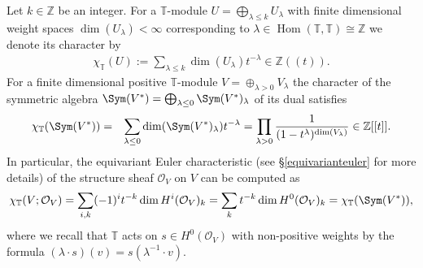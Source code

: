 \documentclass[12pt]{article}
\numberwithin{equation}{section}
\theoremstyle{remark}
\theoremstyle{definition}
\numberwithin{theorem}{section}
\def\beq{\begin{eqnarray}}
\def\eeq{\end{eqnarray}}
\DeclareMathOperator{\Hom}{Hom}
\newcommand{\T}{{\mathbb{T}}}
\def\calO{{\mathcal O}}
\def\Z{\mathbb{Z}}
\renewcommand{\1}{\mathbbm{1}}
\begin{document}
 Let $k\in \Z$ be an integer. For a $\T$-module $U=\bigoplus_{\lambda\leq k} U_\lambda$  with finite dimensional weight spaces $\dim(U_\lambda)<\infty$ corresponding to $\lambda\in \Hom(\T,\T)\cong \Z$   we denote its character by \beq\label{trunchar}\chi_\T(U):=\sum_{\lambda\leq k} \dim(U_\lambda)t^{-\lambda} \in \Z((t)).\eeq For a finite dimensional positive $\T$-module $V=\oplus_{\lambda>0} V_\lambda$  the  character of the  symmetric algebra $\Sym(V^*)=\bigoplus_{\lambda\leq 0} \Sym(V^*)_\lambda$ of its dual satisfies
\beq\label{sym} \chi_\T({\Sym(V^*)})&=& \sum_{\lambda\leq 0} \dim(\Sym(V^*)_\lambda)t^{-\lambda}= %
\prod_{\lambda>0}\frac{1}{( 1- t^{\lambda})^{\dim(V_\lambda)}} \in \Z[[t]].\eeq In particular,  the equivariant Euler characteristic (see \S\ref{equivarianteuler} for more details) of the structure sheaf $\calO_V$ on $V$ can be computed as
\beq \label{eqeu} \chi_\T(V;\calO_V)=\sum_{i,k} (-1)^i t^{-k} \dim H^i(\calO_V)_{k} =\sum_k t^{-k} \dim H^0(\calO_V)_{k} = \chi_\T({\Sym(V^*)}),\eeq where we recall that $\T$ acts on $s
\in H^0(\calO_V)$ with non-positive weights by the formula $(\lambda\cdot s)(v)=s(\lambda^{-1}\cdot v)$. 
\end{document}
